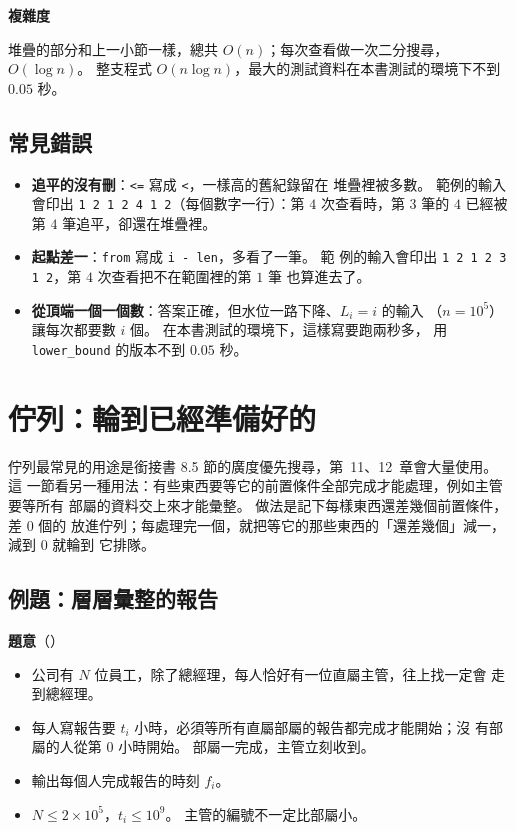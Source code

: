 \textbf{複雜度}

堆疊的部分和上一小節一樣，總共 $O(n)$；每次查看做一次二分搜尋，$O(\log n)$。
整支程式 $O(n \log n)$，最大的測試資料在本書測試的環境下不到 $0.05$ 秒。

\subsection{常見錯誤}

\begin{itemize}
\item \textbf{追平的沒有刪}：\texttt{<=} 寫成 \texttt{<}，一樣高的舊紀錄留在
堆疊裡被多數。 範例的輸入會印出 \texttt{1 2 1 2 4 1 2}（每個數字一行）：第
$4$ 次查看時，第 $3$ 筆的 $4$ 已經被第 $4$ 筆追平，卻還在堆疊裡。
\item \textbf{起點差一}：\texttt{from} 寫成 \texttt{i - len}，多看了一筆。 範
例的輸入會印出 \texttt{1 2 1 2 3 1 2}，第 $4$ 次查看把不在範圍裡的第 $1$ 筆
也算進去了。
\item \textbf{從頂端一個一個數}：答案正確，但水位一路下降、$L_i = i$ 的輸入
（$n = 10^5$）讓每次都要數 $i$ 個。 在本書測試的環境下，這樣寫要跑兩秒多，
用 \texttt{lower\_bound} 的版本不到 $0.05$ 秒。
\end{itemize}

\section{佇列：輪到已經準備好的}
\label{sec:queue}

佇列最常見的用途是銜接書 8.5 節的廣度優先搜尋，第~11、12~章會大量使用。 這
一節看另一種用法：有些東西要等它的前置條件全部完成才能處理，例如主管要等所有
部屬的資料交上來才能彙整。 做法是記下每樣東西還差幾個前置條件，差 $0$ 個的
放進佇列；每處理完一個，就把等它的那些東西的「還差幾個」減一，減到 $0$ 就輪到
它排隊。

\subsection{例題：層層彙整的報告}
\label{sec:ex-reports}

\textbf{題意}（）

\begin{itemize}
\item 公司有 $N$ 位員工，除了總經理，每人恰好有一位直屬主管，往上找一定會
走到總經理。
\item 每人寫報告要 $t_i$ 小時，必須等所有直屬部屬的報告都完成才能開始；沒
有部屬的人從第 $0$ 小時開始。 部屬一完成，主管立刻收到。
\item 輸出每個人完成報告的時刻 $f_i$。
\item $N \le 2 \times 10^5$，$t_i \le 10^9$。 主管的編號不一定比部屬小。
\end{itemize}

